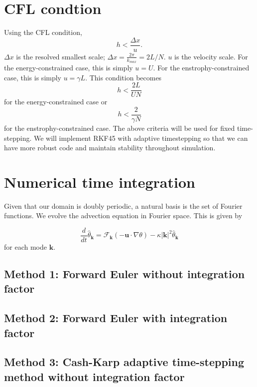\documentclass[12pt]{article}
\begin{document}
\section{CFL condtion}

Using the CFL condition,
\begin{equation}
h < \frac{ \Delta x}{u} .
\end{equation}
$\Delta x$ is the resolved smallest scale; $\Delta x=\frac{2\pi}{k_{max}} = 2L/N$. $u$ is the velocity scale. For the energy-constrained case, this is simply $u=U$. For the enstrophy-constrained case, this is simply $u=\gamma L$. This condition becomes
\begin{equation}
h < \frac{2L }{U N} 
\end{equation}
for the energy-constrained case or
\begin{equation}
h < \frac{2}{\gamma N} 
\end{equation}
for the enstrophy-constrained case. The above criteria will be used for fixed time-stepping. We will implement RKF45 with adaptive timestepping so that we can have more robust code and maintain stability throughout simulation.

\section{Numerical time integration}

Given that our domain is doubly periodic, a natural basis is the set of Fourier functions. We evolve the advection equation in Fourier space. This is given by

\begin{equation}
\label{eq:original_DE}
\frac{d}{d t} \hat{\theta}_{\mathbf{k}} = \mathcal{F}_{\mathbf{k}}(- \mathbf{u}\cdot\nabla \theta) - \kappa |\mathbf{k}|^{2}\hat{\theta}_{\mathbf{k}}
\end{equation}
for each mode $\mathbf{k}$. 
\subsection{Method 1: Forward Euler without integration factor}

\subsection{Method 2: Forward Euler with integration factor}

\subsection{Method 3: Cash-Karp adaptive time-stepping method without integration factor}
\end{document}
